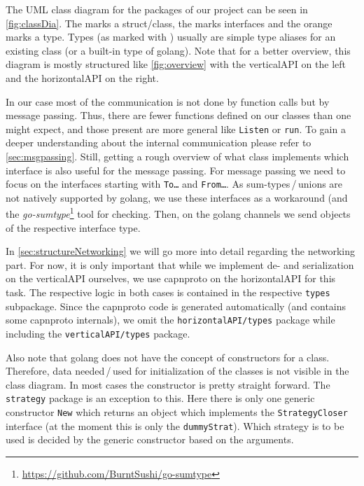 \documentclass[a4paper,english,10pt,NET]{tumarticle}
\begin{document}
The UML class diagram for the packages of our project can be seen in \cref{fig:classDia}.
The  marks a struct/class, the  marks interfaces and the orange  marks a type.
Types (as marked with ) usually are simple type aliases for an existing class (or a built-in type of golang).
Note that for a better overview, this diagram is mostly structured like \cref{fig:overview} with the verticalAPI on the left and the horizontalAPI on the right.

In our case most of the communication is not done by function calls but by message passing.
Thus, there are fewer functions defined on our classes than one might expect, and those present are more general like \texttt{Listen} or \texttt{run}.
To gain a deeper understanding about the internal communication please refer to \cref{sec:msgpassing}.
Still, getting a rough overview of what class implements which interface is also useful for the message passing.
For message passing we need to focus on the interfaces starting with \texttt{To\ldots} and \texttt{From\ldots}.
As sum-types\,/\,unions are not natively supported by golang, we use these interfaces as a workaround (and the \emph{go-sumtype}\footnote{\url{https://github.com/BurntSushi/go-sumtype}} tool for checking.
Then, on the golang channels we send objects of the respective interface type.

In \cref{sec:structureNetworking} we will go more into detail regarding the networking part.
For now, it is only important that while we implement de- and serialization on the verticalAPI ourselves, we use capnproto on the horizontalAPI for this task.
The respective logic in both cases is contained in the respective \texttt{types} subpackage.
Since the capnproto code is generated automatically (and contains some capnproto internals), we omit the \texttt{horizontalAPI/types} package while including the \texttt{verticalAPI/types} package.

Also note that golang does not have the concept of constructors for a class.
Therefore, data needed\,/\,used for initialization of the classes is not visible in the class diagram.
In most cases the constructor is pretty straight forward.
The \texttt{strategy} package is an exception to this.
Here there is only one generic constructor \texttt{New} which returns an object which implements the \texttt{StrategyCloser} interface (at the moment this is only the \texttt{dummyStrat}).
Which strategy is to be used is decided by the generic constructor based on the arguments.
\end{document}
